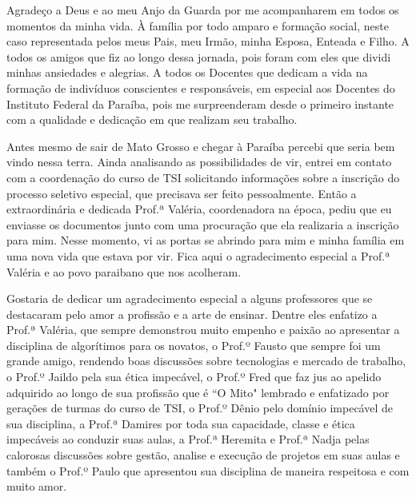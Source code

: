 
\begin{agradecimentos}[AGRADECIMENTOS]

    Agradeço a Deus e ao meu Anjo da Guarda  por me acompanharem em todos os momentos da minha vida. 
    À família por todo amparo e formação social, neste caso representada pelos meus Pais, meu Irmão, minha Esposa, Enteada e Filho.
    A todos os amigos que fiz ao longo dessa jornada, pois foram com eles que dividi minhas ansiedades e alegrias. 
    A todos os Docentes que dedicam a vida na formação de indivíduos conscientes e responsáveis, em especial aos Docentes do Instituto Federal da Paraíba, pois me surpreenderam desde o primeiro instante com a qualidade e dedicação em que realizam seu trabalho.

    Antes mesmo de sair de Mato Grosso e chegar à Paraíba percebi que seria bem vindo nessa terra. Ainda analisando as possibilidades de vir, entrei em contato com a coordenação do curso de TSI solicitando informações sobre a inscrição do processo seletivo especial, que precisava ser feito pessoalmente. Então a extraordinária e dedicada Prof.ª Valéria, coordenadora na época, pediu que eu enviasse os documentos junto com uma procuração que ela realizaria a inscrição para mim. Nesse momento, vi as portas se abrindo para mim e minha família em uma nova vida que estava por vir. Fica aqui o agradecimento especial a Prof.ª Valéria e ao povo paraibano que nos acolheram.

    Gostaria de dedicar um agradecimento especial a alguns professores que se destacaram pelo amor a profissão e a arte de ensinar. Dentre eles enfatizo a Prof.ª Valéria, que sempre demonstrou muito empenho e paixão ao apresentar a disciplina de algorítimos para os novatos, o Prof.º Fausto que sempre foi um grande amigo, rendendo boas discussões sobre tecnologias e mercado de trabalho, o Prof.º Jaildo pela sua ética impecável, o Prof.º Fred que faz jus ao apelido adquirido ao longo de sua profissão que é ``O Mito" \space lembrado e enfatizado por gerações de turmas do curso de TSI, o Prof.º Dênio pelo domínio impecável de sua disciplina, a Prof.ª Damires por toda sua capacidade, classe e ética impecáveis ao conduzir suas aulas, a Prof.ª Heremita e Prof.ª Nadja pelas calorosas discussões sobre gestão, analise e execução de projetos em suas aulas e também o Prof.º Paulo que apresentou sua disciplina de maneira respeitosa e com muito amor.
    

\end{agradecimentos}
